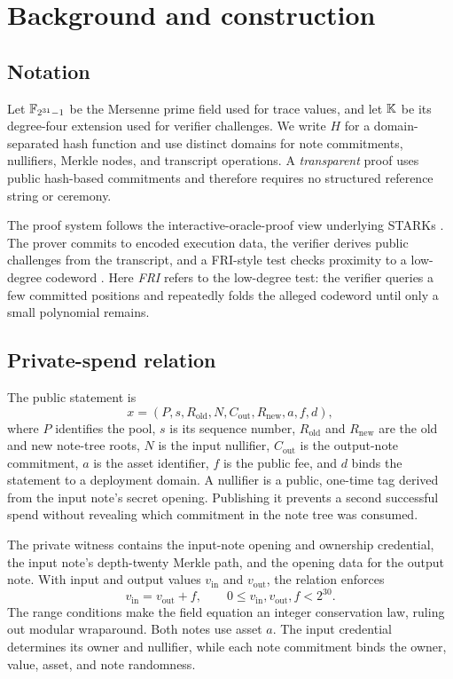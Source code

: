 \section{Background and construction}
\label{sec:background}

\subsection{Notation}

Let \(\mathbb{F}_{2^{31}-1}\) be the Mersenne prime field used for trace values, and let \(\mathbb{K}\) be its
degree-four extension used for verifier challenges.  We write \(H\) for a
domain-separated hash function and use distinct domains for note commitments,
nullifiers, Merkle nodes, and transcript operations.  A \emph{transparent}
proof uses public hash-based commitments and therefore requires no structured
reference string or ceremony.

The proof system follows the interactive-oracle-proof view underlying STARKs
\cite{BenSassonChiesaSpooner2016,
BenSassonBentovHoreshRiabzev2018STARK}.  The prover commits to encoded
execution data, the verifier derives public challenges from the transcript,
and a FRI-style test checks proximity to a low-degree codeword
\cite{BenSassonBentovHoreshRiabzev2018FRI}.  Here \emph{FRI} refers to the
low-degree test: the verifier queries a few committed positions and repeatedly
folds the alleged codeword until only a small polynomial remains.

\subsection{Private-spend relation}

The public statement is
\[
  x=(P,s,R_{\mathrm{old}},N,C_{\mathrm{out}},R_{\mathrm{new}},a,f,d),
\]
where \(P\) identifies the pool, \(s\) is its sequence number,
\(R_{\mathrm{old}}\) and \(R_{\mathrm{new}}\) are the old and new note-tree
roots, \(N\) is the input nullifier, \(C_{\mathrm{out}}\) is the output-note
commitment, \(a\) is the asset identifier, \(f\) is the public fee, and \(d\)
binds the statement to a deployment domain.  A nullifier is a public,
one-time tag derived from the input note's secret opening.  Publishing it
prevents a second successful spend without revealing which commitment in the
note tree was consumed.

The private witness contains the input-note opening and ownership credential,
the input note's depth-twenty Merkle path, and the opening data for the output
note.  With input and output values \(v_{\mathrm{in}}\) and
\(v_{\mathrm{out}}\), the relation enforces
\begin{equation}
  v_{\mathrm{in}}=v_{\mathrm{out}}+f,
  \qquad
  0\leq v_{\mathrm{in}},v_{\mathrm{out}},f<2^{30}.
  \label{eq:value-balance}
\end{equation}
The range conditions make the field equation an integer conservation law,
ruling out modular wraparound.  Both notes use asset \(a\).  The input
credential determines its owner and nullifier, while each note commitment
binds the owner, value, asset, and note randomness.

